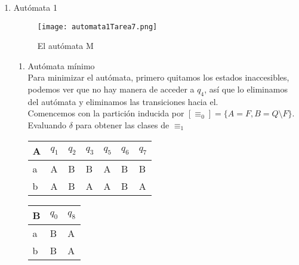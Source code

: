 \documentclass{article}
\begin{document}
    	\begin{enumerate}
    		\item {
    			Autómata 1
    			\begin{figure} [H]
    				\centering
    				\texttt{[image: automata1Tarea7.png]}
    				\caption{El autómata M}
    			\end{figure}
    			 \begin{enumerate}
    				\item {
    				Autómata mínimo\\
    				Para minimizar el autómata, primero quitamos los estados inaccesibles, podemos ver que no hay manera de acceder a $q_{4}$, así que lo eliminamos del autómata y eliminamos las transiciones hacia el.\\
    				
    				Comencemos con la partición inducida por $[\equiv_{0}] = 
    				\{A = F, B = Q \setminus F\}$.\\
    				Evaluando $\delta$ para obtener las clases de $\equiv_{1}$
    				
    				\begin{table}[H]
    					\centering
    					\begin{tabular}{|l|l|l|l|l|l|l|}
    						\hline
    						A & $q_{1}$ & $q_{2}$ & $q_{3}$ & $q_{5}$ & $q_{6}$ & $q_{7}$ \\ \hline
    						a & A       & B       & B       & A       & B       & B       \\ \hline
    						b & A       & B       & A       & A       & B       & A       \\ \hline
    					\end{tabular}
    					\quad
    					\begin{tabular}{|l|l|l|}
    						\hline
    						B &  $q_{0}$ &  $q_{8}$ \\ \hline
    						a &  B &  A       \\ \hline
    						b &  B &  A      \\ \hline
    					\end{tabular}
    				\end{table}
    				
}
\end{enumerate}}
\end{enumerate}
\end{document}
